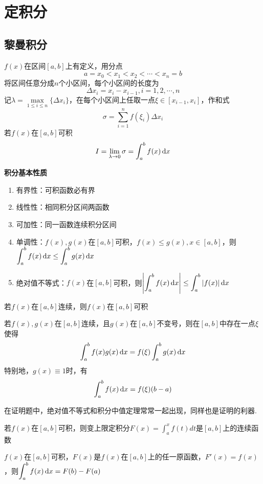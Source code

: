 
\section{定积分}
\label{sec:definite_integration}
\subsection{黎曼积分}
\label{sub:riemann}
\begin{definition}[Riemann积分]
$f(x)$在区间$[a,b]$上有定义，用分点
\[a=x_0<x_1<x_2<\cdots<x_n=b\]
将区间任意分成$n$个小区间，每个小区间的长度为
\[\Delta x_i=x_i-x_{i-1},i=1,2,\cdots,n\]
记$\lambda = \underset{1\leq i\leq n}{\max}\{\Delta x_i\}$，在每个小区间上任取一点$\xi\in[x_{i-1},x_i]$，作和式
\[\sigma = \sum_{i=1}^{n}f(\xi_i)\Delta x_i\]
若$f(x)$在$[a,b]$可积
\[I=\lim_{\lambda\to 0}\sigma=\int_a^bf(x)\,\mathrm{d} x\]
\end{definition}
\par\textbf{积分基本性质}
\begin{enumerate}
	\item 有界性：可积函数必有界
	\item 线性性：相同积分区间两函数
	\item 可加性：同一函数连续积分区间
	\item 单调性：$f(x),g(x)$在$[a,b]$可积，$f(x)\leq g(x),x\in[a,b]$，则$\displaystyle\int_{a}^{b}f(x)\,\mathrm{d} x\leq\int_{a}^{b}g(x)\,\mathrm{d} x$
	\item 绝对值不等式：$f(x)$在$[a,b]$可积，则$\displaystyle\left|\int_{a}^{b}f(x)\,\mathrm{d} x\right|\leq\int_{a}^{b}|f(x)|\,\mathrm{d} x$
\end{enumerate}
\begin{theorem}[闭区间连续函数可积定理]
若$f(x)$在$[a,b]$连续，则$f(x)$在$[a,b]$可积
\end{theorem}
\begin{theorem}[积分第一中值定理]
若$f(x),g(x)$在$[a,b]$连续，且$g(x)$在$[a,b]$不变号，则在$[a,b]$中存在一点$\xi$使得
\[\int_a^bf(x)g(x)\,\mathrm{d} x=f(\xi)\int_a^bg(x)\,\mathrm{d} x\]
特别地，$g(x)\equiv 1$时，有
\[\int_a^bf(x)\,\mathrm{d} x=f(\xi)(b-a)\]
\end{theorem}
\par 在证明题中，绝对值不等式和积分中值定理常常一起出现，同样也是证明的利器.
\begin{theorem}
若$f(x)$在$[a,b]$可积，则变上限定积分$\displaystyle F(x)=\int_a^x f(t)dt$是$[a,b]$上的连续函数
\end{theorem}
\begin{theorem}[微积分基本定理]
$f(x)$在$[a,b]$可积，$F(x)$是$f(x)$在$[a,b]$上的任一原函数，$F'(x)=f(x)$，则$\displaystyle\int_{a}^{b}f(x)\,\mathrm{d} x=F(b)-F(a)$
\end{theorem}
